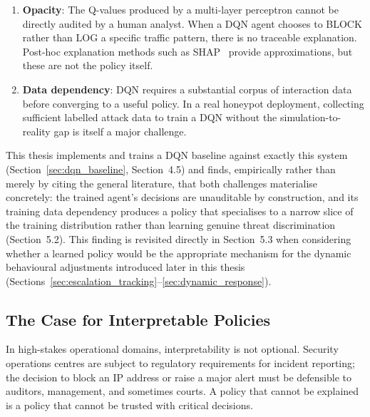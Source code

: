 \begin{enumerate}
  \item \textbf{Opacity}: The Q-values produced by a multi-layer perceptron
        cannot be directly audited by a human analyst.
        When a DQN agent chooses to BLOCK rather than LOG a specific
        traffic pattern, there is no traceable explanation.
        Post-hoc explanation methods such as SHAP~\citep{lundberg2017unified}
        provide approximations, but these are not the policy itself.
  \item \textbf{Data dependency}: DQN requires a substantial corpus of
        interaction data before converging to a useful policy.
        In a real honeypot deployment, collecting sufficient labelled
        attack data to train a DQN without the simulation-to-reality
        gap is itself a major challenge.
\end{enumerate}

This thesis implements and trains a DQN baseline against exactly this
system (Section~\ref{sec:dqn_baseline}, Section~4.5) and finds, empirically
rather than merely by citing the general literature, that both challenges
materialise concretely: the trained agent's decisions are unauditable by
construction, and its training data dependency produces a policy that
specialises to a narrow slice of the training distribution rather than
learning genuine threat discrimination (Section~5.2).
This finding is revisited directly in Section~5.3 when considering whether
a learned policy would be the appropriate mechanism for the dynamic
behavioural adjustments introduced later in this thesis
(Sections~\ref{sec:escalation_tracking}--\ref{sec:dynamic_response}).

\subsection{The Case for Interpretable Policies}

In high-stakes operational domains, interpretability is not optional.
Security operations centres are subject to regulatory requirements for
incident reporting; the decision to block an IP address or raise a
major alert must be defensible to auditors, management, and sometimes
courts.
A policy that cannot be explained is a policy that cannot be trusted with
critical decisions.

